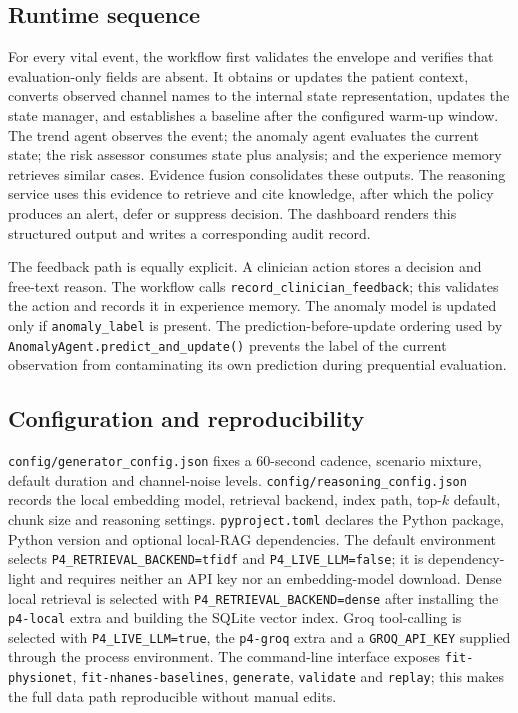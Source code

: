 \documentclass[11pt,a4paper]{article}
\begin{document}
\label{tab:modules}

\subsection{Runtime sequence}
For every vital event, the workflow first validates the envelope and verifies that evaluation-only fields are absent. It obtains or updates the patient context, converts observed channel names to the internal state representation, updates the state manager, and establishes a baseline after the configured warm-up window. The trend agent observes the event; the anomaly agent evaluates the current state; the risk assessor consumes state plus analysis; and the experience memory retrieves similar cases. Evidence fusion consolidates these outputs. The reasoning service uses this evidence to retrieve and cite knowledge, after which the policy produces an alert, defer or suppress decision. The dashboard renders this structured output and writes a corresponding audit record.

The feedback path is equally explicit. A clinician action stores a decision and free-text reason. The workflow calls \texttt{record\_clinician\_feedback}; this validates the action and records it in experience memory. The anomaly model is updated only if \texttt{anomaly\_label} is present. The prediction-before-update ordering used by \texttt{AnomalyAgent.predict\_and\_update()} prevents the label of the current observation from contaminating its own prediction during prequential evaluation.

\subsection{Configuration and reproducibility}
\texttt{config/generator\_config.json} fixes a 60-second cadence, scenario mixture, default duration and channel-noise levels. \texttt{config/reasoning\_config.json} records the local embedding model, retrieval backend, index path, top-$k$ default, chunk size and reasoning settings. \texttt{pyproject.toml} declares the Python package, Python version and optional local-RAG dependencies. The default environment selects \texttt{P4\_RETRIEVAL\_BACKEND=tfidf} and \texttt{P4\_LIVE\_LLM=false}; it is dependency-light and requires neither an API key nor an embedding-model download. Dense local retrieval is selected with \texttt{P4\_RETRIEVAL\_BACKEND=dense} after installing the \texttt{p4-local} extra and building the SQLite vector index. Groq tool-calling is selected with \texttt{P4\_LIVE\_LLM=true}, the \texttt{p4-groq} extra and a \texttt{GROQ\_API\_KEY} supplied through the process environment. The command-line interface exposes \texttt{fit-physionet}, \texttt{fit-nhanes-baselines}, \texttt{generate}, \texttt{validate} and \texttt{replay}; this makes the full data path reproducible without manual edits.
\end{document}
